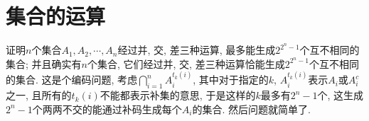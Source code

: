 \chapter{集合的运算}

\bq{}{}
证明$n$个集合$A_1,A_2,\cdots,A_n$经过并, 交, 差三种运算, 最多能生成$2^{2^n-1}$个互不相同的集合; 并且确实有$n$个集合, 它们经过并, 交, 差三种运算恰能生成$2^{2^n-1}$个互不相同的集合.
\eq
\ba
这是个编码问题, 考虑$\bigcap_{i=1}^{n}A_i^{t_k(i)}$, 其中对于指定的$k$, $A_i^{t_k(i)}$表示$A_i$或$A_i^c$之一, 且所有的$t_k(i)$不能都表示补集的意思, 于是这样的$k$最多有$2^n-1$个, 这生成$2^n-1$个两两不交的能通过补码生成每个$A_i$的集合. 然后问题就简单了.
\ea